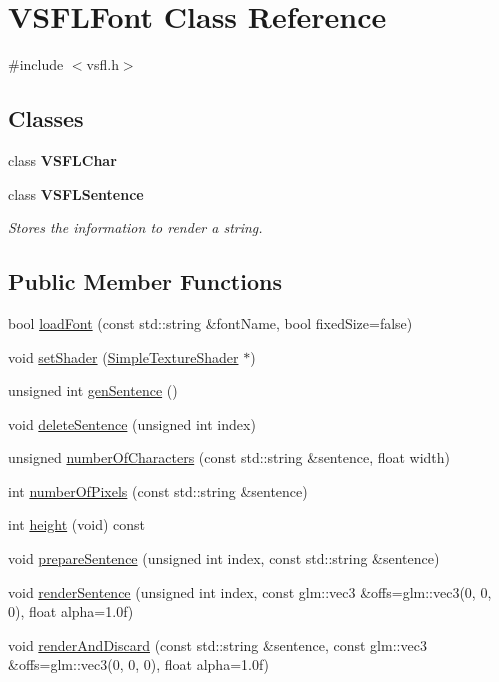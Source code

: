 \hypertarget{classVSFLFont}{\section{\-V\-S\-F\-L\-Font \-Class \-Reference}
\label{classVSFLFont}
}


{\ttfamily \#include $<$vsfl.\-h$>$}

\subsection*{\-Classes}
\begin{DoxyCompactItemize}
\item 
class {\bfseries \-V\-S\-F\-L\-Char}
\item 
class {\bfseries \-V\-S\-F\-L\-Sentence}
\begin{DoxyCompactList}\small\item\em \-Stores the information to render a string. \end{DoxyCompactList}\end{DoxyCompactItemize}
\subsection*{\-Public \-Member \-Functions}
\begin{DoxyCompactItemize}
\item 
bool \hyperlink{classVSFLFont_a918c08943cf561baae9a781448f2a3ac}{load\-Font} (const std\-::string \&font\-Name, bool fixed\-Size=false)
\item 
void \hyperlink{classVSFLFont_a92b032cec5dc73f48287b5a82638e477}{set\-Shader} (\hyperlink{classSimpleTextureShader}{\-Simple\-Texture\-Shader} $\ast$)
\item 
unsigned int \hyperlink{classVSFLFont_aa4a3bea012d09d362d49dce044a9ea95}{gen\-Sentence} ()
\item 
void \hyperlink{classVSFLFont_a303bd95c5195c3a68c645bec0cac6be4}{delete\-Sentence} (unsigned int index)
\item 
unsigned \hyperlink{classVSFLFont_a639bbdc4da72e4a92368e78fc8c5a4a7}{number\-Of\-Characters} (const std\-::string \&sentence, float width)
\item 
int \hyperlink{classVSFLFont_a57de3f16c3486b8ff461cc318e4283f7}{number\-Of\-Pixels} (const std\-::string \&sentence)
\item 
int \hyperlink{classVSFLFont_a611e6cdd03357bcf7dd22c0ef8152c21}{height} (void) const 
\item 
void \hyperlink{classVSFLFont_acd7f7a89c3c92a1ec207b67297b2d2de}{prepare\-Sentence} (unsigned int index, const std\-::string \&sentence)
\item 
void \hyperlink{classVSFLFont_a4eb92452acd85597d8e7f538de17c772}{render\-Sentence} (unsigned int index, const glm\-::vec3 \&offs=glm\-::vec3(0, 0, 0), float alpha=1.\-0f)
\item 
void \hyperlink{classVSFLFont_aaf5b3fe1115327e318c3caba119fb92f}{render\-And\-Discard} (const std\-::string \&sentence, const glm\-::vec3 \&offs=glm\-::vec3(0, 0, 0), float alpha=1.\-0f)
\end{DoxyCompactItemize}



